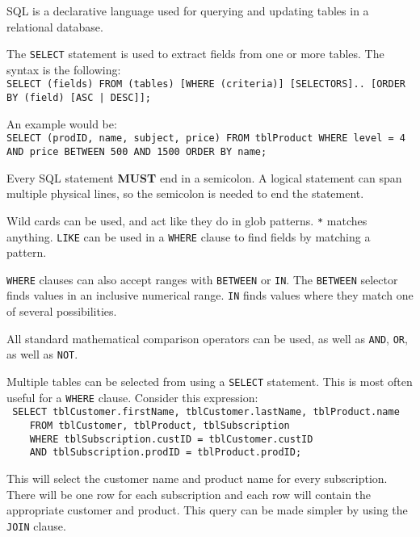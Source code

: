 \documentclass[../main.tex]{subfile}
\begin{document}

SQL is a declarative language used for querying and updating tables in a relational database.

The \texttt{SELECT} statement is used to extract fields from one or more tables. The syntax is the following:\\
\texttt{SELECT (fields) FROM (tables) [WHERE (criteria)] [SELECTORS].. [ORDER BY (field) [ASC | DESC]];}

An example would be:\\
\texttt{SELECT (prodID, name, subject, price) FROM tblProduct WHERE level = 4 AND price BETWEEN 500 AND 1500 ORDER BY name;}

Every SQL statement \textbf{MUST} end in a semicolon. A logical statement can span multiple physical lines, so the semicolon is needed to end the statement.


Wild cards can be used, and act like they do in glob patterns. \texttt{*} matches anything. \texttt{LIKE} can be used in a \texttt{WHERE} clause to find fields by matching a pattern.

\texttt{WHERE} clauses can also accept ranges with \texttt{BETWEEN} or \texttt{IN}. The \texttt{BETWEEN} selector finds values in an inclusive numerical range. \texttt{IN} finds values where they match one of several possibilities.

All standard mathematical comparison operators can be used, as well as \texttt{AND}, \texttt{OR}, as well as \texttt{NOT}.


Multiple tables can be selected from using a \texttt{SELECT} statement. This is most often useful for a \texttt{WHERE} clause. Consider this expression:\\
\texttt{
SELECT tblCustomer.firstName, tblCustomer.lastName, tblProduct.name\\
    FROM tblCustomer, tblProduct, tblSubscription\\
    WHERE tblSubscription.custID = tblCustomer.custID\\
    AND tblSubscription.prodID = tblProduct.prodID;
}

This will select the customer name and product name for every subscription. There will be one row for each subscription and each row will contain the appropriate customer and product. This query can be made simpler by using the \texttt{JOIN} clause.
\end{document}
